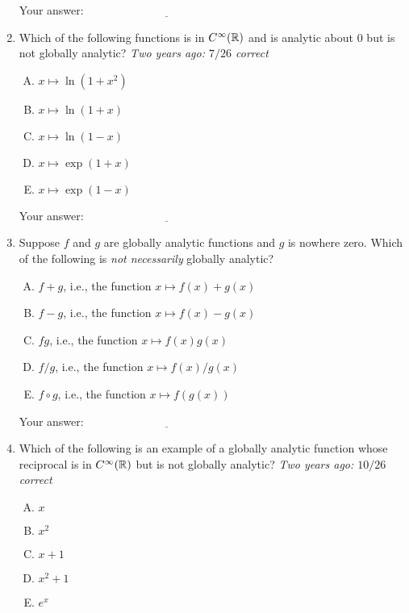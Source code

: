 \documentclass[10pt]{amsart}
\begin{document}
\begin{enumerate}
  \vspace{0.05in}
  Your answer: $\underline{\qquad\qquad\qquad\qquad\qquad\qquad\qquad}$
  \vspace{0.05in}

\item Which of the following functions is in $C^\infty(\mathbb{R})$ and is
  analytic about $0$ but is not globally analytic? {\em Two years ago:
  $7/26$ correct}
  \begin{enumerate}[(A)]
  \item $x \mapsto \ln(1 + x^2)$
  \item $x \mapsto \ln(1 + x)$
  \item $x \mapsto \ln(1 - x)$
  \item $x \mapsto \exp(1 + x)$
  \item $x \mapsto \exp(1 - x)$
  \end{enumerate}

  \vspace{0.05in}
  Your answer: $\underline{\qquad\qquad\qquad\qquad\qquad\qquad\qquad}$
  \vspace{0.05in}

\item Suppose $f$ and $g$ are globally analytic functions and $g$ is
  nowhere zero. Which of the following is {\em not necessarily}
  globally analytic?

  \begin{enumerate}[(A)]
  \item $f + g$, i.e., the function $x \mapsto f(x) + g(x)$
  \item $f - g$, i.e., the function $x \mapsto f(x) - g(x)$
  \item $fg$, i.e., the function $x \mapsto f(x)g(x)$
  \item $f/g$, i.e., the function $x \mapsto f(x)/g(x)$
  \item $f \circ g$, i.e., the function $x \mapsto f(g(x))$
  \end{enumerate}

  \vspace{0.05in}
  Your answer: $\underline{\qquad\qquad\qquad\qquad\qquad\qquad\qquad}$
  \vspace{0.05in}


\item Which of the following is an example of a globally analytic
  function whose reciprocal is in $C^\infty(\mathbb{R})$ but is not globally
  analytic? {\em Two years ago: $10/26$ correct}

  \begin{enumerate}[(A)]
  \item $x$
  \item $x^2$
  \item $x + 1$
  \item $x^2 + 1$
  \item $e^x$
  \end{enumerate}


\end{enumerate}
\end{document}
